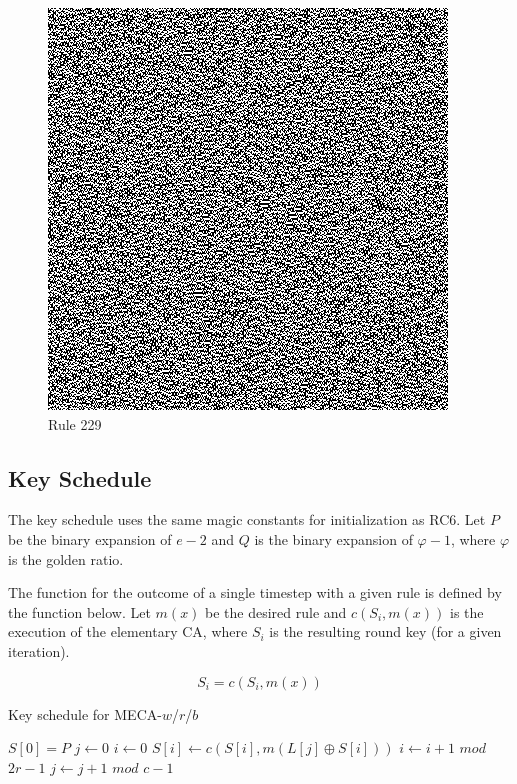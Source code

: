 \documentclass{article}
\begin{document}
\begin{figure}[H]
\begin{center}
\begin{minipage}{0.48\textwidth}
      \caption{Rule 229}
      \label{fig:figure10}
      \centering
      \includegraphics[scale=.5]{229.png}
    \end{minipage}
  \end{center}
\end{figure}

\subsection{Key Schedule}

The key schedule uses the same magic constants for initialization as RC6. Let $P$ be the binary expansion of $e-2$ and $Q$ is the binary expansion of $\varphi-1$, where $\varphi$ is the golden ratio.

The function for the outcome of a single timestep with a given rule is defined by the function below. Let $m(x)$ be the desired rule and $c(S_i, m(x))$ is the execution of the elementary CA, where $S_i$ is the resulting round key (for a given iteration).

$$
 S_i = c(S_i, m(x)) 
$$

\begin{algorithm}[H]
  \begin{algorithmic}
    \caption{Key schedule for MECA-$w$/$r$/$b$}\label{alg:schedule}
    \Input
    \EndInput
    \Output
    \EndOutput
    \State $S[0] = P$
    \EndFor
    \State $j \gets 0$
    \State $i \gets 0$
      \State $S[i] \gets c(S[i], m(L[j] \oplus S[i]))$ 
      \State $i \gets i+1$ $mod$ $2r-1$
      \State $j \gets j+1$ $mod$ $c-1$
    \EndFor
  \end{algorithmic}
\end{algorithm}
\end{document}
